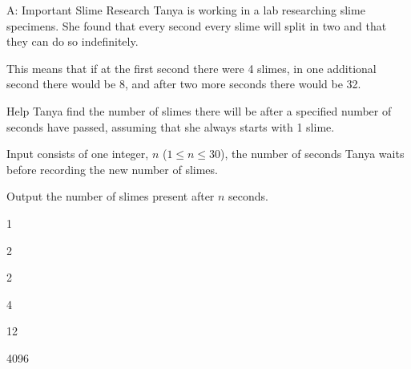 \begin{problem}{A: Important Slime Research}
Tanya is working in a lab researching slime specimens. She found that every second every slime will split in two and that they can do so indefinitely.

This means that if at the first second there were 4 slimes, in one additional second there would be 8, and after two more seconds there would be 32.

Help Tanya find the number of slimes there will be after a specified number of seconds have passed, assuming that she always starts with 1 slime. 
\end{problem}

\begin{formalin}
Input consists of one integer, $n$ ($1 \leq n \leq 30$), the number of seconds Tanya waits before recording the new number of slimes.
\end{formalin}

\begin{formalout}
Output the number of slimes present after $n$ seconds.
\end{formalout}

\begin{datain}
1
\end{datain}
\begin{dataout}
2
\end{dataout}

\begin{datain}
2
\end{datain}
\begin{dataout}
4
\end{dataout}

\begin{datain}
12
\end{datain}
\begin{dataout}
4096
\end{dataout}

